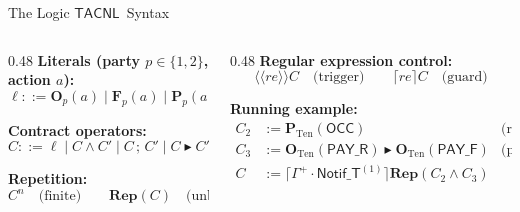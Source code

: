 \documentclass[9pt,aspectratio=169]{beamer}
\newcommand{\logic}[1]{\ensuremath{\mathsf{#1}}\xspace}
\newcommand{\cDL}{\logic{TACNL}}
\newcommand{\repair}{\ensuremath{\blacktriangleright}}
\newcommand{\obl}[2][]{\mathbf{O}_{#1}(#2)}
\newcommand{\frb}[2][]{\mathbf{F}_{#1}(#2)}
\newcommand{\perm}[2][]{\mathbf{P}_{#1}(#2)}
\newcommand{\repit}[1]{\mathbf{Rep}(#1)}
\newcommand{\guard}[2][]{\lceil #1 \rceil #2}
\newcommand{\trig}[2][]{\langle\!\langle #1 \rangle\!\rangle #2}
\newcommand{\PAY}{\ensuremath{\mathsf{PAY\_R}}\xspace}
\newcommand{\PAYF}{\ensuremath{\mathsf{PAY\_F}}\xspace}
\newcommand{\OCC}{\ensuremath{\mathsf{OCC}}\xspace}
\newcommand{\notifterm}{\ensuremath{\mathsf{Notif\_T}}}
\begin{document}
\begin{frame}{The Logic \cDL \textemdash\ Syntax}
\small
\begin{columns}[T]
\begin{column}{0.48\textwidth}
  \textbf{Literals (party $p \in \{1,2\}$, action $a$):}
  \[
  \ell ::= \obl[p]{a} \mid \frb[p]{a} \mid \perm[p]{a} \mid \top \mid \bot
  \]

  \textbf{Contract operators:}
  \[
  C ::= \ell \mid C \wedge C' \mid C\,;\,C' \mid C \repair C'
  \]

  \textbf{Repetition:}
  \[
  C^n \quad\text{(finite)}\qquad \repit{C} \quad\text{(unbounded)}
  \]
\end{column}
\begin{column}{0.48\textwidth}
  \textbf{Regular expression control:}
  \[
  \trig[re]{C} \quad\text{(trigger)} \qquad \guard[re]{C} \quad\text{(guard)}
  \]

  \medskip
  \textbf{Running example:}
  \begin{align*}
    C_2 &:= \perm[\text{Ten}]{\OCC}  &\text{(right to occupy)}\\
    C_3 &:= \obl[\text{Ten}]{\PAY} \repair \obl[\text{Ten}]{\PAYF} &\text{(pay or fine)}\\
    C   &:= \guard[\Gamma^+ \!\cdot\! \notifterm^{(1)}]{\repit{C_2 \wedge C_3}}
  \end{align*}
\end{column}
\end{columns}
\end{frame}
\end{document}
